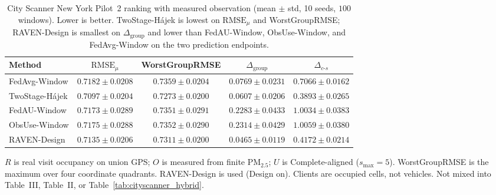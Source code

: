 \begin{table}[t]
\centering
\caption{City Scanner New York Pilot~2 ranking with measured observation
(mean $\pm$ std, 10 seeds, $100$ windows).  Lower is better.
TwoStage-H\'ajek is lowest on $\mathrm{RMSE}_{\mu}$ and WorstGroupRMSE;
RAVEN-Design is smallest on $\Delta_{\mathrm{group}}$ and
lower than FedAU-Window, ObsUse-Window, and FedAvg-Window on the two prediction
endpoints.}
\label{tab:cityscanner_p2_measured_o}
\scriptsize
\setlength{\tabcolsep}{2.5pt}
\begin{tabular*}{\textwidth}{@{\extracolsep{\fill}}lcccc}
\toprule
Method & $\mathrm{RMSE}_{\mu}$ & WorstGroupRMSE &
$\Delta_{\mathrm{group}}$ & $\Delta_{c\text{-}s}$\\
\midrule
FedAvg-Window & $0.7182{\pm}0.0208$ & $0.7359{\pm}0.0204$ & $0.0769{\pm}0.0231$ & $0.7066{\pm}0.0162$\\
TwoStage-H\'ajek & $\mathbf{0.7097}{\pm}0.0204$ & $\mathbf{0.7273}{\pm}0.0200$ & $0.0607{\pm}0.0206$ & $\mathbf{0.3893}{\pm}0.0265$\\
FedAU-Window & $0.7173{\pm}0.0289$ & $0.7351{\pm}0.0291$ & $0.2283{\pm}0.0433$ & $1.0034{\pm}0.0383$\\
ObsUse-Window & $0.7175{\pm}0.0288$ & $0.7352{\pm}0.0290$ & $0.2314{\pm}0.0429$ & $1.0059{\pm}0.0380$\\
RAVEN-Design & $0.7135{\pm}0.0206$ & $0.7311{\pm}0.0200$ & $\mathbf{0.0465}{\pm}0.0119$ & $0.4172{\pm}0.0214$\\
\bottomrule
\end{tabular*}

\par\vspace{2pt}
\noindent\raggedright\scriptsize
$R$ is real visit occupancy on union GPS; $O$ is measured from finite
{PM}$_{2.5}$; $U$ is Complete-aligned ($s_{\max}=5$).
WorstGroupRMSE is the maximum over four coordinate quadrants.
RAVEN-Design is used (Design on).
Clients are occupied cells, not vehicles.
Not mixed into Table~III,
Table~II, or Table~\ref{tab:cityscanner_hybrid}.
\end{table}


